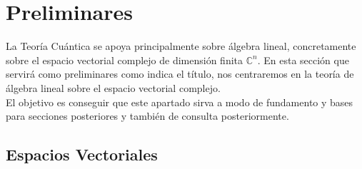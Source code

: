 \documentclass[a4paper]{article}
\numberwithin{equation}{section}
\begin{document}
\newpage

\section{Preliminares}

La Teoría Cuántica se apoya principalmente sobre álgebra lineal, concretamente sobre el espacio vectorial complejo de dimensión finita $\mathbb{C}^n$.
En esta sección que servirá como preliminares como indica el título, nos centraremos en la teoría de álgebra lineal sobre el espacio vectorial complejo.\\
El objetivo es conseguir que este apartado sirva a modo de fundamento y bases para secciones posteriores y también de consulta posteriormente.

\subsection{Espacios Vectoriales}
\end{document}
